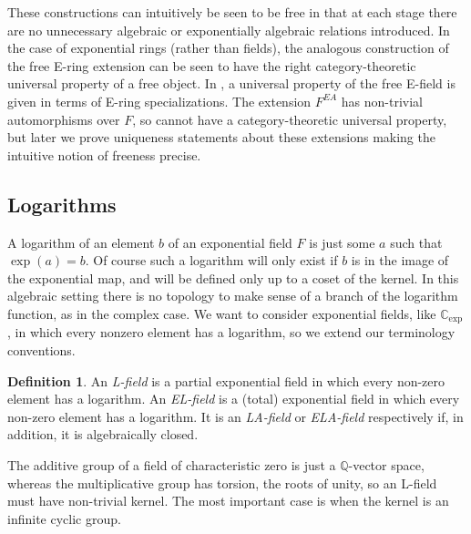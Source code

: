 \documentclass[12pt]{amsart}
\theoremstyle{definition}
\newtheorem{defn}[prop]{Definition}
\begin{document}
These constructions can intuitively be seen to be free in that at each stage there are no
unnecessary algebraic or exponentially algebraic relations introduced. In the case of exponential rings (rather than fields), the analogous construction of the free E-ring extension can be seen to have the right category-theoretic universal property of a free object. In \cite{Macintyre91}, a universal property of the free E-field is given in terms of E-ring specializations. The extension $F^{EA}$ has non-trivial automorphisms over $F$, so cannot have a category-theoretic universal property, but later we prove uniqueness statements about these extensions making the intuitive notion of freeness precise.

\subsection*{Logarithms}

A logarithm of an element $b$ of an exponential field $F$ is just some $a$ such that $\exp(a) = b$. Of course such a logarithm will only exist if $b$ is in the image of the exponential map, and will be defined only up to a coset of the kernel. In this algebraic setting there is no topology to make sense of a branch of the logarithm function, as in the complex case. We want to consider exponential fields, like {\ensuremath{\mathbb{C}_{\mathrm{exp}}}}, in which every nonzero element has a logarithm, so we extend our terminology conventions.

\begin{defn}
  An \emph{L-field} is a partial exponential field in which every non-zero element has a logarithm. An \emph{EL-field} is a (total) exponential field in which every non-zero element has a logarithm. It is an \emph{LA-field} or \emph{ELA-field} respectively if, in addition, it is algebraically closed.
\end{defn}

The additive group of a field of characteristic zero is just a ${\ensuremath{\mathbb{Q}}}$-vector space, whereas the multiplicative group has torsion, the roots of unity, so an L-field must have non-trivial kernel. The most important case is when the kernel is an infinite cyclic group.
\end{document}

